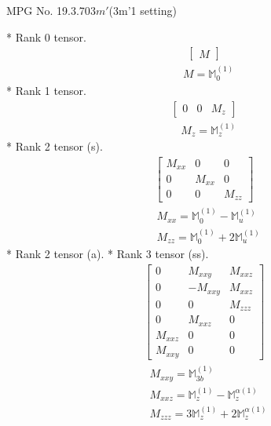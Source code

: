 \documentclass[fleqn,8pt,landscape]{jsarticle}
\begin{document}
\setcounter{MaxMatrixCols}{32}

\renewcommand{\tablename}{Table~}
\renewcommand{\figurename}{Figure~}
\begin{center}
\LARGE
MPG No. 19.3.70\quad$3m'$\quad(3m'1 setting)
\end{center}
* Rank 0 tensor.
\begin{align*}
\begin{bmatrix} M \end{bmatrix}
\end{align*}
\begin{align*}
& M = \mathbb{M}_{0}^{(1)}
\end{align*}
* Rank 1 tensor.
\begin{align*}
\begin{bmatrix} 0 & 0 & M_{z} \end{bmatrix}
\end{align*}
\begin{align*}
& M_{z} = \mathbb{M}_{z}^{(1)}
\end{align*}
* Rank 2 tensor (s).
\begin{align*}
\begin{bmatrix} M_{xx} & 0 & 0 \\ 0 & M_{xx} & 0 \\ 0 & 0 & M_{zz} \end{bmatrix}
\end{align*}
\begin{align*}
& M_{xx} = \mathbb{M}_{0}^{(1)} - \mathbb{M}_{u}^{(1)} \\
& M_{zz} = \mathbb{M}_{0}^{(1)} + 2 \mathbb{M}_{u}^{(1)}
\end{align*}
* Rank 2 tensor (a).
* Rank 3 tensor (ss).
\begin{align*}
\begin{bmatrix} 0 & M_{xxy} & M_{xxz} \\ 0 & - M_{xxy} & M_{xxz} \\ 0 & 0 & M_{zzz} \\ 0 & M_{xxz} & 0 \\ M_{xxz} & 0 & 0 \\ M_{xxy} & 0 & 0 \end{bmatrix}
\end{align*}
\begin{align*}
& M_{xxy} = \mathbb{M}_{3b}^{(1)} \\
& M_{xxz} = \mathbb{M}_{z}^{(1)} - \mathbb{M}_{z}^{\alpha(1)} \\
& M_{zzz} = 3 \mathbb{M}_{z}^{(1)} + 2 \mathbb{M}_{z}^{\alpha(1)}
\end{align*}
\end{document}
